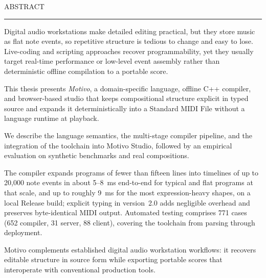 ABSTRACT

\vspace{0.5cm}
\hrule
\vspace{0.5cm}

Digital audio workstations make detailed editing practical, but they store music as flat note events, so repetitive
structure is tedious to change and easy to lose.
Live-coding and scripting approaches recover programmability, yet they usually target real-time performance or
low-level event assembly rather than deterministic offline compilation to a portable score.

This thesis presents \textit{Motivo}, a domain-specific language, offline C++ compiler, and browser-based studio that
keeps compositional structure explicit in typed source and expands it deterministically into a Standard MIDI File
without a language runtime at playback.

We describe the language semantics, the multi-stage compiler pipeline, and the integration of the toolchain into
Motivo Studio, followed by an empirical evaluation on synthetic benchmarks and real compositions.

The compiler expands programs of fewer than fifteen lines into timelines of up to 20,000 note events in about 5--8~ms
end-to-end for typical and flat programs at that scale, and up to roughly 9~ms for the most expression-heavy shapes,
on a local Release build; explicit typing in version~2.0 adds negligible overhead and preserves byte-identical MIDI
output.
Automated testing comprises 771 cases (652 compiler, 31 server, 88 client), covering the toolchain from parsing through
deployment.

Motivo complements established digital audio workstation workflows: it recovers editable structure in source form while
exporting portable scores that interoperate with conventional production tools.
